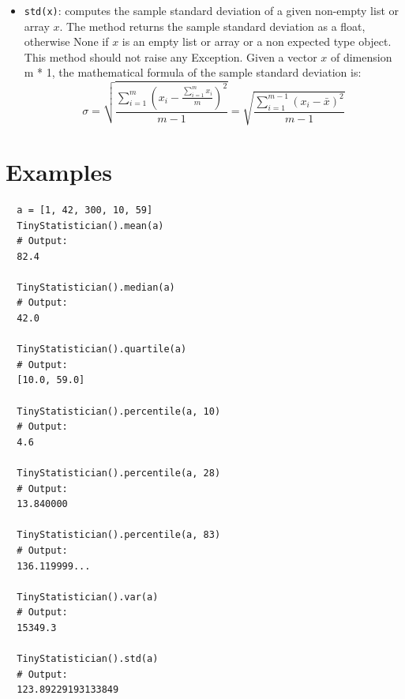 \documentclass{42-en}
\begin{document}
\begin{itemize}
  \item \texttt{std(x)}: computes the sample standard deviation of a given non-empty list or array $x$.
        The method returns the sample standard deviation as a float,
        otherwise None if $x$ is an empty list or array or a non expected type object.
        This method should not raise any Exception.
        \newline
        Given a vector $x$ of dimension m * 1, the mathematical formula of the sample standard deviation is:
        $$
        \sigma = \sqrt{\frac{\sum_{i = 1}^{m}{(x_i - \frac{\sum_{i = 1}^{m}{x_i}}{m})^2}}{m - 1}} = \sqrt{\frac{\sum_{i = 1}^{m - 1}{(x_i - \bar{x})^2}}{m-1}}
        $$
\end{itemize}

\section*{Examples}

\begin{verbatim}  
  a = [1, 42, 300, 10, 59]
  TinyStatistician().mean(a)
  # Output:
  82.4

  TinyStatistician().median(a)
  # Output:
  42.0

  TinyStatistician().quartile(a)
  # Output:
  [10.0, 59.0]

  TinyStatistician().percentile(a, 10)
  # Output:
  4.6

  TinyStatistician().percentile(a, 28)
  # Output:
  13.840000

  TinyStatistician().percentile(a, 83)
  # Output:
  136.119999...

  TinyStatistician().var(a)
  # Output:
  15349.3

  TinyStatistician().std(a)
  # Output:
  123.89229193133849
\end{verbatim}



\newpage

\end{document}
